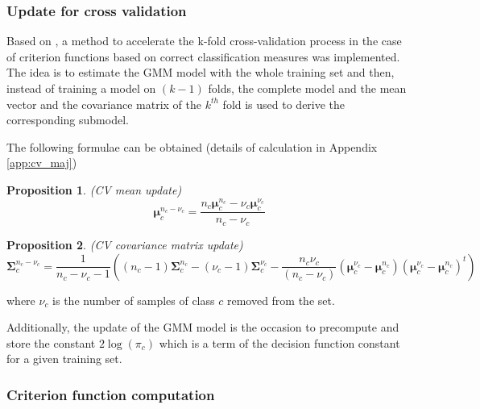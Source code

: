 \documentclass[a4paper,11pt,DIV=16,abstracton]{scrartcl}
\newtheorem{prop}{Proposition}
\begin{document}
        \subsubsection{Update for cross validation}
        \label{sec:update-cv}

        Based on \cite{fauvel2015fast}, a method to accelerate the k-fold cross-validation process in the case of criterion functions based on correct classification measures was implemented. The idea is to estimate the GMM model with the whole training set and then, instead of training a model on $(k-1)$ folds, the complete model and the mean vector and the covariance matrix of the $k^{th}$ fold is used to derive the corresponding submodel.

        The following formulae can be obtained (details of calculation in Appendix \ref{app:cv_maj})
        \begin{prop}
            \label{eq:update-cv1}
            (CV mean update)
            \begin{equation*}
                \boldsymbol{\mu}_c^{n_c-\nu_c} = \frac{n_c \boldsymbol{\mu}_c^{n_c} - \nu_c \boldsymbol{\mu}_c^{\nu_c}}{n_c - \nu_c} \nonumber
            \end{equation*}
        \end{prop}
        \begin{prop}
            \label{eq:update-cv2}
            (CV covariance matrix update)
            \begin{equation*}
                \boldsymbol{\Sigma}_c^{n_c-\nu_c} = \frac{1}{n_c-\nu_c-1} ( (n_c-1) \boldsymbol{\Sigma}_c^{n_c} - (\nu_c-1) \boldsymbol{\Sigma}_c^{\nu_c} - \frac{n_c \nu_c}{(n_c-\nu_c)} (\boldsymbol{\mu}_c^{\nu_c}-\boldsymbol{\mu}_c^{n_c})(\boldsymbol{\mu}_c^{\nu_c}-\boldsymbol{\mu}_c^{n_c})^t) \nonumber
            \end{equation*}
        \end{prop}
        where $\nu_c$ is the number of samples of class $c$ removed from the set.

        Additionally, the update of the GMM model is the occasion to precompute and store the constant $2 \log (\pi_c)$ which is a term of the decision function constant for a given training set.

        \subsubsection{Criterion function computation}
        \label{sec:update-crit}
\end{document}
